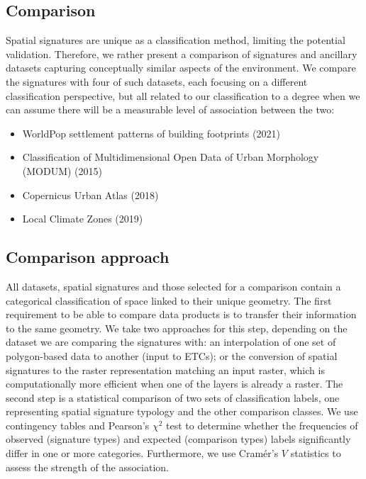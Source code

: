 \documentclass[fleqn,10pt]{wlscirep}
\begin{document}
\subsection*{Comparison}
Spatial signatures are unique as a classification method, limiting the potential
validation. Therefore, we rather present a comparison of signatures and ancillary datasets capturing
conceptually similar aspects of the environment. We compare the signatures with four of
such datasets, each focusing on a different classification perspective, but all related
to our classification to a degree when we can assume there will be a measurable level of
association between the two:
\begin{itemize}
    \item WorldPop settlement patterns of building footprints (2021)\cite{jochem2021tools}
    \item Classification of Multidimensional Open Data of Urban Morphology (MODUM) (2015)\cite{alexiou2016}
    \item Copernicus Urban Atlas (2018)\cite{eea2018}
    \item Local Climate Zones (2019)\cite{demuzere2019mapping}
\end{itemize}
\subsection*{Comparison approach}
All datasets, spatial signatures and those selected for a comparison contain a
categorical classification of space linked to their unique geometry. The first
requirement to be able to compare data products is to transfer their
information to the same geometry. We take two approaches for this step,
depending on the dataset we are comparing the signatures with:
an interpolation of one set of polygon-based data to another (input to ETCs);
or the conversion of
spatial signatures to the raster representation matching an input raster,
which is computationally more efficient when one of the layers is already a raster. The second
step is a statistical comparison of two sets of classification labels, one representing
spatial signature typology and the other comparison classes. We use contingency tables
and Pearson's $\chi^{2}$ test to determine whether the frequencies of observed
(signature types) and expected (comparison types) labels significantly differ in one or
more categories. Furthermore, we use Cramér's $V$ statistics\cite{cramer2016mathematical} to assess the strength of
the association.
\end{document}
